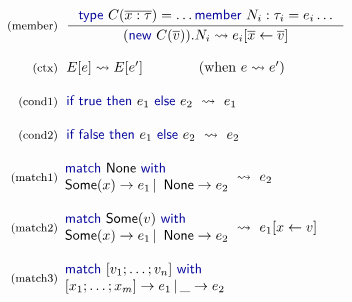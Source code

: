 \documentclass[preprint]{sigplanconf}
\newcommand{\kvd}[1]{\textnormal{\textcolor{kvdclr}{\sffamily #1}}}
\newcommand{\ident}[1]{\textnormal{\sffamily #1}}
\newcommand{\reduce}{\rightsquigarrow}
\begin{document}
\begin{figure}
\begin{equation*}
\begin{array}{rl}
 \textnormal{\footnotesize{(member)}}&
 \hspace{-0.4em}
 \inference
 { \kvd{type}~C(\overline{x:\tau})=\ldots \kvd{member}~N_i : \tau_i = e_i \ldots }
 { (\kvd{new}~C(\overline{v})).N_i \reduce e_i[\overline{x} \leftarrow \overline{v}] }\\
 \\
 \textnormal{\footnotesize{(ctx)}}&
 \hspace{-0.4em}
  E[e] \reduce E[e'] \qquad\qquad(\textnormal{when}~e \reduce e')\\
 \\
 \textnormal{\footnotesize{(cond1)}}&
 \hspace{-0.4em}
 \kvd{if}~\kvd{true}~\kvd{then}~e_1~\kvd{else}~e_2 ~\reduce~ e_1 \\
 \\
 \textnormal{\footnotesize{(cond2)}}&
 \hspace{-0.4em}
 \kvd{if}~\kvd{false}~\kvd{then}~e_1~\kvd{else}~e_2 ~\reduce~ e_2 \\
 \\
 \textnormal{\footnotesize{(match1)}}&
 \hspace{-1em}
 \begin{array}{l}
  \kvd{match}~\ident{None}~\kvd{with} \\
  \ident{Some}(x) \rightarrow e_1 \,|\, \ident{None} \rightarrow e_2
 \end{array} \hspace{-0.5em} ~\reduce~ e_2 \\
 \\
 \textnormal{\footnotesize{(match2)}}&
 \hspace{-1em}
 \begin{array}{l}
    \kvd{match}~\ident{Some}(v)~\kvd{with} \\
    \ident{Some}(x) \rightarrow e_1 \,|\, \ident{None} \rightarrow e_2
 \end{array} \hspace{-0.5em} ~\reduce~ e_1[x\leftarrow v]\\
 \\
 \textnormal{\footnotesize{(match3)}}&
 \hspace{-1em}
 \begin{array}{l}
  \kvd{match}~[v_1;\ldots;v_n]~\kvd{with} \\[0em]
  [x_1;\ldots;x_m ] \rightarrow e_1 \,|\, \_ \rightarrow e_2

\end{array}
\end{array}
\end{equation*}
\end{figure}
\end{document}

